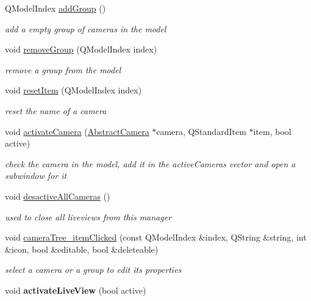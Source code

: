 \begin{DoxyCompactItemize}
\item 
Q\-Model\-Index \hyperlink{class_abstract_camera_manager_a4eaaf63434076e5d53d19a44f434bec9}{add\-Group} ()
\begin{DoxyCompactList}\small\item\em add a empty group of cameras in the model \end{DoxyCompactList}\item 
void \hyperlink{class_abstract_camera_manager_a5eea7f4d2ab3ea314020b405550b378c}{remove\-Group} (Q\-Model\-Index index)
\begin{DoxyCompactList}\small\item\em remove a group from the model \end{DoxyCompactList}\item 
void \hyperlink{class_abstract_camera_manager_a89cd0d1f9bb47d4abda51ea4f1e08f49}{reset\-Item} (Q\-Model\-Index index)
\begin{DoxyCompactList}\small\item\em reset the name of a camera \end{DoxyCompactList}\item 
void \hyperlink{class_abstract_camera_manager_aeafa7b5e2b0eb5bbc105fe6a0ee5e2f2}{activate\-Camera} (\hyperlink{class_abstract_camera}{Abstract\-Camera} $\ast$camera, Q\-Standard\-Item $\ast$item, bool active)
\begin{DoxyCompactList}\small\item\em check the camera in the model, add it in the active\-Cameras vector and open a subwindow for it \end{DoxyCompactList}\item 
\hypertarget{class_abstract_camera_manager_a92ed218ecaab3f6a75d3d24e5544d17f}{void \hyperlink{class_abstract_camera_manager_a92ed218ecaab3f6a75d3d24e5544d17f}{desactive\-All\-Cameras} ()}\label{class_abstract_camera_manager_a92ed218ecaab3f6a75d3d24e5544d17f}

\begin{DoxyCompactList}\small\item\em used to close all liveviews from this manager \end{DoxyCompactList}\item 
void \hyperlink{class_abstract_camera_manager_a10dee0f2e9a5efa1cf8b5775df66fb19}{camera\-Tree\-\_\-item\-Clicked} (const Q\-Model\-Index \&index, Q\-String \&string, int \&icon, bool \&editable, bool \&deleteable)
\begin{DoxyCompactList}\small\item\em select a camera or a group to edit its properties \end{DoxyCompactList}\item 
\hypertarget{class_abstract_camera_manager_a01cbc0e517b10e8b1c087138307ab676}{void {\bfseries activate\-Live\-View} (bool active)}\label{class_abstract_camera_manager_a01cbc0e517b10e8b1c087138307ab676}


\end{DoxyCompactItemize}
